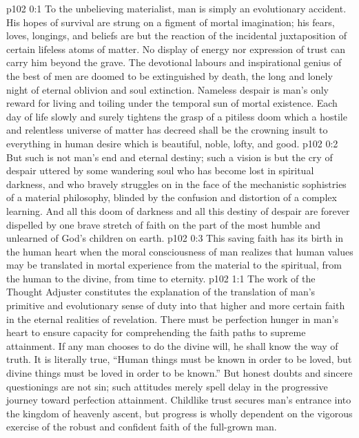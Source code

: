 \author{Melchizedek}
\vs p102 0:1 To the unbelieving materialist, man is simply an evolutionary accident. His hopes of survival are strung on a figment of mortal imagination; his fears, loves, longings, and beliefs are but the reaction of the incidental juxtaposition of certain lifeless atoms of matter. No display of energy nor expression of trust can carry him beyond the grave. The devotional labours and inspirational genius of the best of men are doomed to be extinguished by death, the long and lonely night of eternal oblivion and soul extinction. Nameless despair is man’s only reward for living and toiling under the temporal sun of mortal existence. Each day of life slowly and surely tightens the grasp of a pitiless doom which a hostile and relentless universe of matter has decreed shall be the crowning insult to everything in human desire which is beautiful, noble, lofty, and good.
\vs p102 0:2 But such is not man’s end and eternal destiny; such a vision is but the cry of despair uttered by some wandering soul who has become lost in spiritual darkness, and who bravely struggles on in the face of the mechanistic sophistries of a material philosophy, blinded by the confusion and distortion of a complex learning. And all this doom of darkness and all this destiny of despair are forever dispelled by one brave stretch of faith on the part of the most humble and unlearned of God’s children on earth.
\vs p102 0:3 This saving faith has its birth in the human heart when the moral consciousness of man realizes that human values may be translated in mortal experience from the material to the spiritual, from the human to the divine, from time to eternity.
\vs p102 1:1 The work of the Thought Adjuster constitutes the explanation of the translation of man’s primitive and evolutionary sense of duty into that higher and more certain faith in the eternal realities of revelation. There must be perfection hunger in man’s heart to ensure capacity for comprehending the faith paths to supreme attainment. If any man chooses to do the divine will, he shall know the way of truth. It is literally true, “Human things must be known in order to be loved, but divine things must be loved in order to be known.” But honest doubts and sincere questionings are not sin; such attitudes merely spell delay in the progressive journey toward perfection attainment. Childlike trust secures man’s entrance into the kingdom of heavenly ascent, but progress is wholly dependent on the vigorous exercise of the robust and confident faith of the full\hyp{}grown man.
